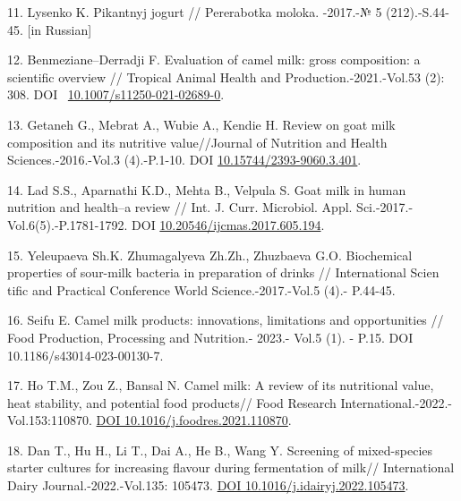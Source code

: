 \begin{refs}
11. Lysenko K. Pikantnyj jogurt // Pererabotka moloka. -2017.-№ 5
(212).-S.44-45. {[}in Russian{]}

12. Benmeziane--Derradji F. Evaluation of camel milk: gross composition:
a scientific overview // Tropical Animal Health and
Production.-2021.-Vol.53 (2): 308. DOI
~\href{https://doi.org/10.1007/s11250-021-02689-0}{10.1007/s11250-021-02689-0}.

13. Getaneh G., Mebrat A., Wubie A., Kendie H. Review on goat milk
composition and its nutritive value//Journal of Nutrition and Health
Sciences.-2016.-Vol.3 (4).-P.1-10. DOI
\href{http://dx.doi.org/10.15744/2393-9060.3.401}{10.15744/2393-9060.3.401}.

14. Lad S.S., Aparnathi K.D., Mehta B., Velpula S. Goat milk in human
nutrition and health--a review // Int. J. Curr. Microbiol. Appl.
Sci.-2017.-Vol.6(5).-P.1781-1792. DOI
\href{http://dx.doi.org/10.20546/ijcmas.2017.605.194}{10.20546/ijcmas.2017.605.194}.

15. Yeleupaeva Sh.K. Zhumagalyeva Zh.Zh., Zhuzbaeva G.O. Biochemical
properties of sour-milk bacteria in preparation of drinks //
International Scien tific and Practical Conference World
Science.-2017.-Vol.5 (4).- P.44-45.

16. Seifu E. Camel milk products: innovations, limitations and
opportunities // Food Production, Processing and Nutrition.- 2023.-
Vol.5 (1). - P.15. DOI 10.1186/s43014-023-00130-7.

17. Ho T.M., Zou Z., Bansal N. Camel milk: A review of its nutritional
value, heat stability, and potential food products// Food Research
International.-2022.-Vol.153:110870.
\href{https://doi.org/10.1016/j.foodres.2021.110870}{DOI
10.1016/j.foodres.2021.110870}.

18. Dan T., Hu H., Li T., Dai A., He B., Wang Y. Screening of
mixed-species starter cultures for increasing flavour during
fermentation of milk// International Dairy Journal.-2022.-Vol.135:
105473. \href{https://doi.org/10.1016/j.idairyj.2022.105473}{DOI
10.1016/j.idairyj.2022.105473}.
\end{refs}

